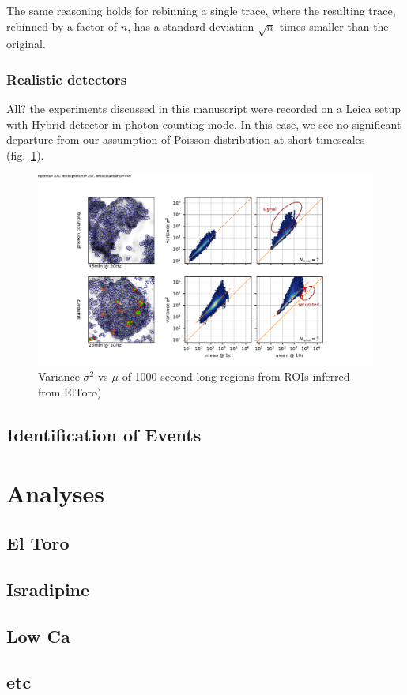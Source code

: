 \documentclass[a4paper,11pt,oneside,]{article}
\begin{document}
The same reasoning holds for rebinning a single trace, where the resulting trace, rebinned by a factor of $n$,  has a standard deviation $\sqrt{n}$ times smaller than the original.


\subsubsection{Realistic detectors}
All{\color{red}?} the experiments discussed in this manuscript were recorded on a Leica setup with Hybrid detector in photon counting mode.
In this case, we see no significant departure from our assumption of Poisson distribution at short timescales (fig.~\ref{fig:mean_vs_var}).


\begin{figure}[t]
 \centering
 \includegraphics{figures/mean_vs_var.pdf}
 \caption{
 Variance $\sigma^2$ vs $\mu$ of 1000 second long regions from ROIs inferred from {\color{red} ElToro)}
 }
 \label{fig:mean_vs_var}
\end{figure}




\subsection{Identification of Events}

\newpage

\section{Analyses}
\subsection{El Toro}
\subsection{Isradipine}
\subsection{Low Ca}
\subsection{etc}


\end{document}
